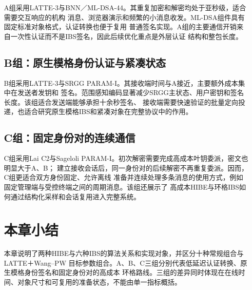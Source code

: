 A组采用LATTE-3与BNN／ML-DSA-44。其重复加密和解密均处于亚秒级，适合需要交互响应的机构
消息、浏览器演示和频繁的小消息收发。ML-DSA组件具有固定标准对象格式，认证转换也便于复用
普通签名实现。A组的主要通信开销来自一次性认证而不是IBS签名，因此后续优化重点是外层认证
结构和整包长度。

\subsection{B组：原生模格身份认证与紧凑状态}

B组采用LATTE-3与SRGG PARAM-I。其接收端时间与A接近，主要额外成本集中在发送者发钥和
签名。范围感知编码显著减少SRGG主状态、用户密钥和签名长度。该组适合发送端能够承担十余秒签名、
接收端需要快速验证的批量定向投递，也适合研究原生模格IBS和紧凑对象在完整协议中的作用。

\subsection{C组：固定身份对的连续通信}

C组采用Lai C2与Sageloli PARAM-I。初次解密需要完成高成本叶钥委派，密文也明显大于A、B；
建立接收会话后，同一身份对的后续解密不再重复委派。因而，C组更适合双方身份固定、允许离线
准备并连续处理多条消息的使用方式，例如固定管理端与受控终端之间的周期消息。该组还展示了
高成本HIBE与环格IBS如何通过结构化采样和会话复用进入完整系统。

\section{本章小结}

本章说明了两种HIBE与六种IBS的算法关系和实现对象，并区分十种常规组合与LATTE＋Wang--PW
目标参数组合。A、B、C三组分别代表低延迟认证转换、原生模格身份签名和固定身份对的高成本
环格路线。三组的差异同时体现在在线时间、对象尺寸和可复用的准备状态，不能由单一指标概括。
